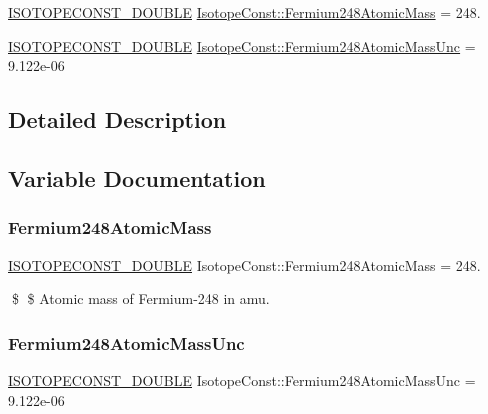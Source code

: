 \begin{DoxyCompactItemize}
\item 
\mbox{\hyperlink{group___isotope_const-_macros_ga8f45a7272ce02c0b4c65c44636ed719a}{I\+S\+O\+T\+O\+P\+E\+C\+O\+N\+S\+T\+\_\+\+D\+O\+U\+B\+LE}} \mbox{\hyperlink{group___isotope_const-_fermium-_fm248_gaa6f93361d65ca36c78df0441ab51910c}{Isotope\+Const\+::\+Fermium248\+Atomic\+Mass}} = 248.
\item 
\mbox{\hyperlink{group___isotope_const-_macros_ga8f45a7272ce02c0b4c65c44636ed719a}{I\+S\+O\+T\+O\+P\+E\+C\+O\+N\+S\+T\+\_\+\+D\+O\+U\+B\+LE}} \mbox{\hyperlink{group___isotope_const-_fermium-_fm248_ga0136d1eb1aa8bf901c3a0c404292496f}{Isotope\+Const\+::\+Fermium248\+Atomic\+Mass\+Unc}} = 9.\+122e-\/06
\end{DoxyCompactItemize}


\subsection{Detailed Description}


\subsection{Variable Documentation}
\mbox{\label{group___isotope_const-_fermium-_fm248_gaa6f93361d65ca36c78df0441ab51910c}} 
\subsubsection{\texorpdfstring{Fermium248\+Atomic\+Mass}{Fermium248AtomicMass}}
{\footnotesize\ttfamily \mbox{\hyperlink{group___isotope_const-_macros_ga8f45a7272ce02c0b4c65c44636ed719a}{I\+S\+O\+T\+O\+P\+E\+C\+O\+N\+S\+T\+\_\+\+D\+O\+U\+B\+LE}} Isotope\+Const\+::\+Fermium248\+Atomic\+Mass = 248.}

\$ \$ Atomic mass of Fermium-\/248 in amu. \mbox{\label{group___isotope_const-_fermium-_fm248_ga0136d1eb1aa8bf901c3a0c404292496f}} 
\subsubsection{\texorpdfstring{Fermium248\+Atomic\+Mass\+Unc}{Fermium248AtomicMassUnc}}
{\footnotesize\ttfamily \mbox{\hyperlink{group___isotope_const-_macros_ga8f45a7272ce02c0b4c65c44636ed719a}{I\+S\+O\+T\+O\+P\+E\+C\+O\+N\+S\+T\+\_\+\+D\+O\+U\+B\+LE}} Isotope\+Const\+::\+Fermium248\+Atomic\+Mass\+Unc = 9.\+122e-\/06}


